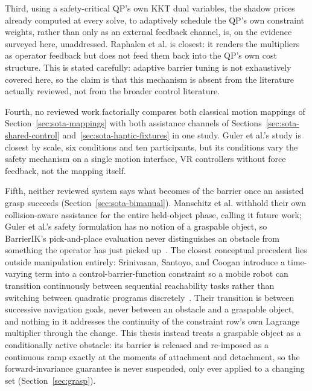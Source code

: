 \documentclass[12pt,a4paper,twoside,openright]{report}
\begin{document}
Third, using a safety-critical QP's own KKT dual variables, the shadow prices already computed at every solve, to adaptively schedule the QP's own constraint weights, rather than only as an external feedback channel, is, on the evidence surveyed here, unaddressed. Raphalen et al. is closest: it renders the multipliers as operator feedback but does not feed them back into the QP's own cost structure. This is stated carefully: adaptive barrier tuning is not exhaustively covered here, so the claim is that this mechanism is absent from the literature actually reviewed, not from the broader control literature.

Fourth, no reviewed work factorially compares both classical motion mappings of Section~\ref{sec:sota-mappings} with both assistance channels of Sections~\ref{sec:sota-shared-control} and~\ref{sec:sota-haptic-fixtures} in one study. Guler et al.'s study is closest by scale, six conditions and ten participants, but its conditions vary the safety mechanism on a single motion interface, VR controllers without force feedback, not the mapping itself.

Fifth, neither reviewed system says what becomes of the barrier once an assisted grasp succeeds (Section~\ref{sec:sota-bimanual}). Manschitz et al. withhold their own collision-aware assistance for the entire held-object phase, calling it future work; Guler et al.'s safety formulation has no notion of a graspable object, so BarrierIK's pick-and-place evaluation never distinguishes an obstacle from something the operator has just picked up~\cite{manschitz2025samplinggrasp,guler2026barrierik}. The closest conceptual precedent lies outside manipulation entirely: Srinivasan, Santoyo, and Coogan introduce a time-varying term into a control-barrier-function constraint so a mobile robot can transition continuously between sequential reachability tasks rather than switching between quadratic programs discretely~\cite{srinivasan2020continuous}. Their transition is between successive navigation goals, never between an obstacle and a graspable object, and nothing in it addresses the continuity of the constraint row's own Lagrange multiplier through the change. This thesis instead treats a graspable object as a conditionally active obstacle: its barrier is released and re-imposed as a continuous ramp exactly at the moments of attachment and detachment, so the forward-invariance guarantee is never suspended, only ever applied to a changing set (Section~\ref{sec:grasp}).
\end{document}
